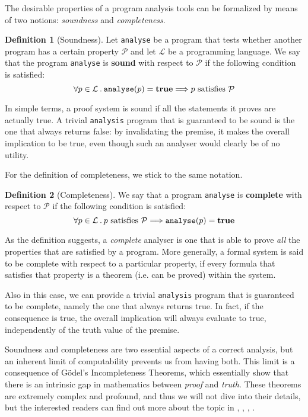 \documentclass[target=mst,aauheader=aics]{thud}
\newcommand{\st}{\hspace{2px}.\hspace{2px}}
\theoremstyle{definition}
\newtheorem{defn}{Definition}
\begin{document}
	The desirable properties of a program analysis tools can be formalized by means of two notions: \textit{soundness} and \textit{completeness}.
	
	\begin{defn}[Soundness]
		Let \texttt{analyse} be a program that tests whether another program has a certain property $\mathcal{P}$ and let $\mathcal{L}$ be a programming language. We say that the program \texttt{analyse} is \textbf{sound} with respect to $\mathcal{P}$ if the following condition is satisfied:
		\[
		\forall p \in \mathcal{L} \st \text{\texttt{analyse}}(p) = \text{\textbf{true}} \Longrightarrow p \text{ satisfies } \mathcal{P}
		\]
	\end{defn}
	In simple terms, a proof system is sound if all the statements it proves are actually true. A trivial \texttt{analysis} program that is guaranteed to be sound is the one that always returns false: by invalidating the premise, it makes the overall implication to be true, even though such an analyser would clearly be of no utility.
	
	For the definition of completeness, we stick to the same notation.
	\begin{defn}[Completeness]
		We say that a program \texttt{analyse} is \textbf{complete} with respect to $\mathcal{P}$ if the following condition is satisfied:
		\[
		\forall p \in \mathcal{L} \st p \text{ satisfies } \mathcal{P} \Longrightarrow \text{\texttt{analyse}}(p) = \text{\textbf{true}} 
		\]
	\end{defn}
	As the definition suggests, a \textit{complete} analyser is one that is able to prove \textit{all} the properties that are satisfied by a program. More generally, a formal system is said to be complete with respect to a particular property, if every formula that satisfies that property is a theorem (i.e. can be proved) within the system.
	
	Also in this case, we can provide a trivial \texttt{analysis} program that is guaranteed to be complete, namely the one that always returns true. In fact, if the consequence is true, the overall implication will always evaluate to true, independently of the truth value of the premise.
	
	Soundness and completeness are two essential aspects of a correct analysis, but an inherent limit of computability prevents us from having both. This limit is a consequence of Gödel's Incompleteness Theorems, which essentially show that there is an intrinsic gap in mathematics between \textit{proof} and \textit{truth}. These theorems are extremely complex and profound, and thus we will not dive into their details, but the interested readers can find out more about the topic in \cite{DovierGiaco}, \cite{Odifreddi1989}, \cite{Rogers1987}, \cite{Hinman2007}.
\end{document}

